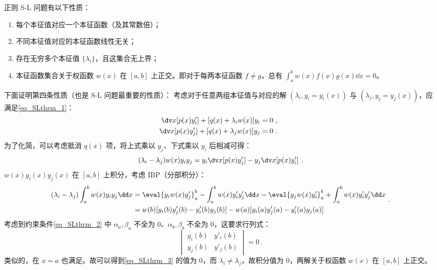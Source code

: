 正则 S-L 问题有以下性质：
\begin{enumerate}
\item 每个本征值对应一个本征函数（及其常数倍）；
\item 不同本征值对应的本征函数线性无关；
\item 存在无穷多个本征值 $\{\lambda_i\}$，且这集合无上界；
\item 本征函数集合关于权函数 $w(x)$ 在 $[a,b]$ 上正交。即对于每两本征函数 $f \neq g$，总有 $\int_a^b w(x)f(x)g(x) \dd x = 0$。 
\end{enumerate}
下面证明第四条性质（也是 S-L 问题最重要的性质）：
考虑对于任意两组本征值与对应的解 $(\lambda_i, y_i=y_i(x))$ 与 $(\lambda_j, y_j=y_j(x))$，应满足\autoref{eq_SLthrm_1}：
\begin{equation}
\begin{aligned}
\dv x [p(x) y'_i] + [q(x) + \lambda_i w(x)] y_i &= 0 ~,\\
\dv x [p(x) y'_j] + [q(x) + \lambda_j w(x)] y_j &= 0 ~.
\end{aligned} ~~
\end{equation}
为了化简，可以考虑抵消 $q(x)$ 项，将上式乘以 $y_j$、下式乘以 $y_i$ 后相减可得：
\begin{equation}
(\lambda_i - \lambda_j)w(x) y_i y_j = y_i \dv x [p(x) y'_j] - y_j \dv x [p(x) y'_i] ~.
\end{equation}
$w(x)y_i(x) y_j(x)$ 在 $[a, b]$ 上积分，考虑 IBP（分部积分）：
\begin{equation}\label{eq_SLthrm_3}
\begin{aligned}
(\lambda_i - \lambda_j) \int_a^b w(x) y_i y_j \dd x &= \eval{y_i w(x) y'_j}_a^b - \int_a^b w(x) y'_i y'_j \dd x - \eval{y_j w(x) y'_i}_a^b + \int_a^b w(x) y'_i y'_j \dd x\\
&= w(b) [y_i(b) y'_j(b) - y'_i(b) y_j(b)] - w(a) [y_i(a) y'_j(a) - y'_i(a) y_j(a)] 
\end{aligned} ~.
\end{equation}
考虑到约束条件\autoref{eq_SLthrm_2} 中 $\alpha_a, \beta_a$ 不全为 $0$、$\alpha_b, \beta_b$ 不全为 $0$，这要求行列式：
\begin{equation}
\begin{vmatrix}
y_i(b) & y'_i(b) \\
y_j(b) & y'_j(b)
\end{vmatrix} = 0~.
\end{equation}
类似的，在 $x=a$ 也满足。故可以得到\autoref{eq_SLthrm_3} 的值为 $0$，而 $\lambda_i \neq \lambda_j$，故积分值为 $0$，两解关于权函数 $w(x)$ 在 $[a, b]$ 上正交。


